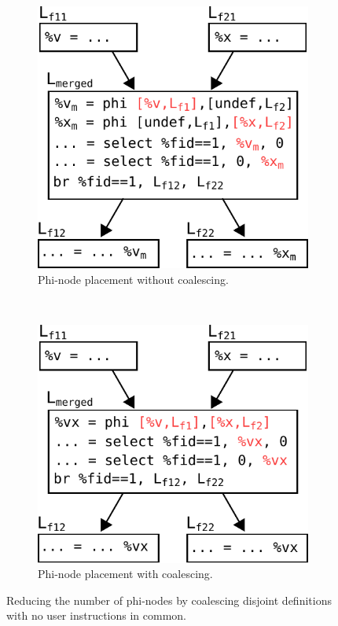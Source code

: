 \begin{figure}[h]
  \centering
  \begin{subfigure}{.5\textwidth}
    \center
    \includegraphics[scale=0.65]{src/merge-operation/figs/phi-coalescing-gen-1}
    \caption{Phi-node placement without coalescing.}
    \label{fig:phi-coalescing-gen-1}
  \end{subfigure}
  \\
  \begin{subfigure}{.5\textwidth}
    \center
    \includegraphics[scale=0.65]{src/merge-operation/figs/phi-coalescing-gen-2}
    \caption{Phi-node placement with coalescing.}
    \label{fig:phi-coalescing-gen-2}
  \end{subfigure}
  \caption{Reducing the number of phi-nodes by coalescing disjoint definitions with no user instructions
in common.}
  \label{fig:phi-coalescing-gen}
\end{figure}

